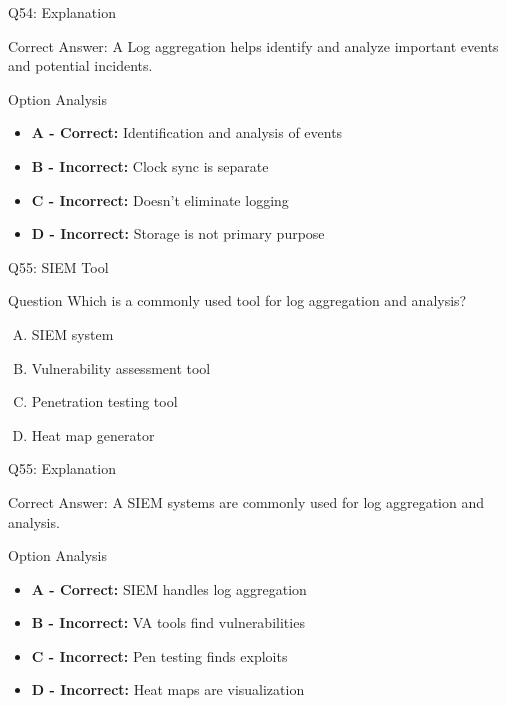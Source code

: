 \documentclass{beamer}
\begin{document}
	\begin{frame}{Q54: Explanation}
		\begin{block}{Correct Answer: A}
			Log aggregation helps identify and analyze important events and potential incidents.
		\end{block}
		\begin{block}{Option Analysis}
			\begin{itemize}
				\item \textbf{A - Correct:} Identification and analysis of events
				\item \textbf{B - Incorrect:} Clock sync is separate
				\item \textbf{C - Incorrect:} Doesn't eliminate logging
				\item \textbf{D - Incorrect:} Storage is not primary purpose
			\end{itemize}
		\end{block}
	\end{frame}
	
	\begin{frame}{Q55: SIEM Tool}
		\begin{block}{Question}
			Which is a commonly used tool for log aggregation and analysis?
		\end{block}
		\begin{enumerate}[(A)]
			\item SIEM system
			\item Vulnerability assessment tool
			\item Penetration testing tool
			\item Heat map generator
		\end{enumerate}
	\end{frame}
	
	\begin{frame}{Q55: Explanation}
		\begin{block}{Correct Answer: A}
			SIEM systems are commonly used for log aggregation and analysis.
		\end{block}
		\begin{block}{Option Analysis}
			\begin{itemize}
				\item \textbf{A - Correct:} SIEM handles log aggregation
				\item \textbf{B - Incorrect:} VA tools find vulnerabilities
				\item \textbf{C - Incorrect:} Pen testing finds exploits
				\item \textbf{D - Incorrect:} Heat maps are visualization
			\end{itemize}
		\end{block}
	\end{frame}
	
\end{document}
